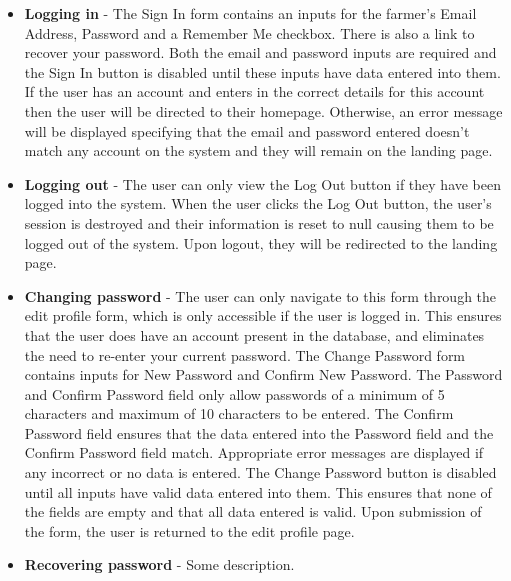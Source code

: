 \documentclass[11pt,fleqn]{book} %
\begin{document}
\begin{itemize}
			\item\textbf{Logging in} -
			The Sign In form contains an inputs for the farmer's Email Address, Password and a Remember Me checkbox. There is also a link to recover your password. Both the email and password inputs are required and the Sign In button is disabled until these inputs have data entered into them. If the user has an account and enters in the correct details for this account then the user will be directed to their homepage. Otherwise, an error message will be displayed specifying that the email and password entered doesn't match any account on the system and they will remain on the landing page.
			
			\item\textbf{Logging out} -
			The user can only view the Log Out button if they have been logged into the system. When the user clicks the Log Out button, the user's session is destroyed and their information is reset to null causing them to be logged out of the system. Upon logout, they will be redirected to the landing page.
			
			\item\textbf{Changing password} -
			The user can only navigate to this form through the edit profile form, which is only accessible if the user is logged in. This ensures that the user does have an account present in the database, and eliminates the need to re-enter your current password. The Change Password form contains inputs for New Password and Confirm New Password. The Password and Confirm Password field only allow passwords of a minimum of 5 characters and maximum of 10 characters to be entered. The Confirm Password field ensures that the data entered into the Password field and the Confirm Password field match. Appropriate error messages are displayed if any incorrect or no data is entered. The Change Password button is disabled until all inputs have valid data entered into them. This ensures that none of the fields are empty and that all data entered is valid. Upon submission of the form, the user is returned to the edit profile page.
			
			\item\textbf{Recovering password} -
			Some description.
		\end{itemize}
\end{document}

